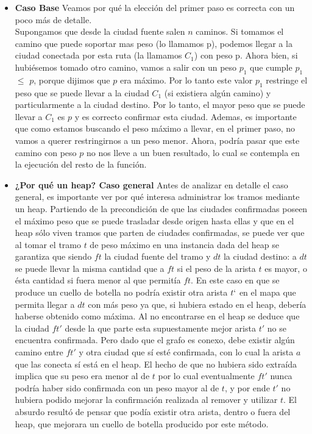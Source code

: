 \begin{itemize}
 \item \textbf{Caso Base} Veamos por qué la elección del primer paso es correcta con un poco más de detalle.\\
Supongamos que desde la ciudad fuente salen $n$ caminos.
Si tomamos el camino que puede soportar mas peso (lo llamamos p), podemos llegar
a la ciudad conectada por esta ruta (la llamamos $C_1$) con peso p. Ahora bien,
si hubiésemos tomado otro camino, vamos a salir con un peso $p_1$ que cumple
$p_1$ $\leq$ $p$, porque dijimos que $p$ era máximo. Por lo tanto este valor
$p_1$ restringe el peso que se puede llevar a la ciudad $C_1$ (si existiera
algún camino) y particularmente a la ciudad destino. Por lo tanto, el mayor
peso que se puede llevar a $C_1$ es $p$ y es correcto confirmar esta ciudad. Ademas, es importante que como estamos
buscando el peso máximo a llevar, en el primer paso, no vamos a querer
restringirnos a un peso menor. Ahora, podría pasar que este camino con peso $p$
no nos lleve a un buen resultado, lo cual se contempla en la ejecución del resto de la función.

\item \textbf{¿Por qué un heap? Caso general} Antes de analizar en detalle el caso general, es importante ver por qué interesa administrar los tramos mediante un heap. Partiendo de la precondición de que las ciudades confirmadas poseen el máximo peso que se puede trasladar desde origen hasta ellas y que en el heap sólo viven tramos que parten de ciudades confirmadas, se puede ver que al tomar el tramo $t$ de peso máximo en una instancia dada del heap se garantiza que siendo $ft$ la ciudad fuente del tramo y $dt$ la ciudad destino: a $dt$ se puede llevar la misma cantidad que a $ft$ si el peso de la arista $t$ es mayor, o ésta cantidad si fuera menor al que permitía $ft$. En este caso en que se produce un cuello de botella no podría existir otra arista $t`$ en el mapa que permita llegar a $dt$ con más peso ya que, si hubiera estado en el heap, debería haberse obtenido como máxima. Al no encontrarse en el heap se deduce que la ciudad $ft'$ desde la que parte esta supuestamente mejor arista $t'$ no se encuentra confirmada. Pero dado que el grafo es conexo, debe existir algún camino entre $ft'$ y otra ciudad que sí esté confirmada, con lo cual la arista $a$ que las conecta sí está en el heap. El hecho de que no hubiera sido extraída implica que su peso era menor al de $t$ por lo cual eventualmente $ft'$ nunca podría haber sido confirmada con un peso mayor al de $t$, y por ende $t'$ no hubiera podido mejorar la confirmación realizada al remover y utilizar $t$. El absurdo resultó de pensar que podía existir otra arista, dentro o fuera del heap, que mejorara un cuello de botella producido por este método.\\


\end{itemize}
